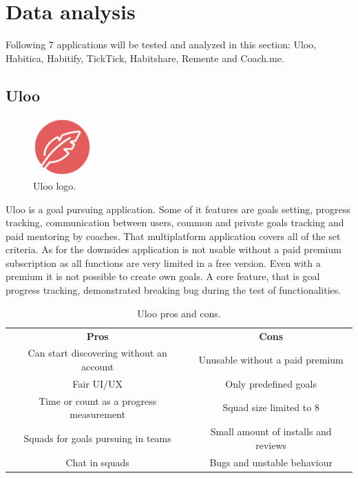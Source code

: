 \section{Data analysis}\label{sec:data-analysis}

Following 7 applications will be tested and analyzed in this section: Uloo, Habitica, Habitify, TickTick, Habitshare, Remente and Coach.me.

\subsection{Uloo}\label{subsec:uloo}

\begin{figure}[h!]
    \includegraphics[width=0.20\textwidth]{images/uloo-logo.png}
    \caption{Uloo logo.\cite{uloo-logo}}
    \label{fig:uloo-logo}
\end{figure}

Uloo is a goal pursuing application.
Some of it features are goals setting, progress tracking, communication between users, common and private goals tracking and paid mentoring by coaches.
That multiplatform application covers all of the set criteria.
As for the downsides application is not usable without a paid premium subscription as all functions are very limited in a free version.
Even with a premium it is not possible to create own goals.
A core feature, that is goal progress tracking, demonstrated breaking bug during the test of functionalities.

\begin{table}[h!]
    \centering
    \begin{adjustbox}{width=\textwidth}
        \begin{ctucolortab}
            \begin{tabular}{cc}
                \bfseries Pros & \bfseries Cons\\\Midrule
                Can start discovering without an account & Unusable without a paid premium\\
                Fair UI/UX & Only predefined goals\\
                Time or count as a progress measurement & Squad size limited to 8\\
                Squads for goals pursuing in teams & Small amount of installs and reviews\\
                Chat in squads & Bugs and unstable behaviour\\
            \end{tabular}
        \end{ctucolortab}
    \end{adjustbox}
    \caption{Uloo pros and cons.}\label{tab:uloo-pros-cons}
\end{table}

